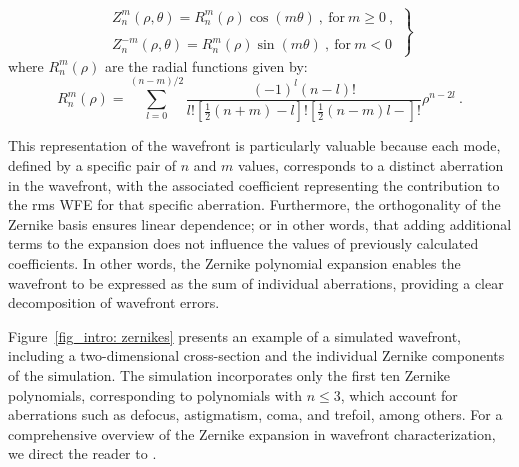 \begin{equation}
  \left.
  \begin{array}{l}
  Z _ n ^m (\rho, \theta) = R _ n ^m (\rho) \cos (m\theta)\ , \ \text{for} \ m \geqslant 0 \ ,\\
  \\
  Z _ n ^{-m} (\rho, \theta) = R _ n ^m (\rho) \sin (m\theta) \ , \ \text{for}  \ m < 0 \ 
  \end{array}
  \right\}
\end{equation}
where $R _ n ^m (\rho)$ are the radial functions given by:
\begin{equation}
  R_n^m(\rho)=\sum_{l=0}^{(n-m) / 2} \frac{(-1)^l(n-l)!}{l!\left[\frac{1}{2}(n+m)-l\right]!\left[\frac{1}{2}(n-m)l-\right]!}\rho ^{n - 2l} \ .
\end{equation}

This representation of the wavefront is particularly valuable because each mode, defined by a specific pair of $n$ and $m$ values, corresponds to a distinct aberration in the wavefront, with the associated coefficient representing the contribution to the rms WFE for that specific aberration. Furthermore, the orthogonality of the Zernike basis ensures linear dependence; or in other words, that adding additional terms to the expansion does not influence the values of previously calculated coefficients. In other words, the Zernike polynomial expansion enables the wavefront to be expressed as the sum of individual aberrations, providing a clear decomposition of wavefront errors.

Figure~\ref{fig_intro: zernikes} presents an example of a simulated wavefront, including a two-dimensional cross-section and the individual Zernike components of the simulation. The simulation incorporates only the first ten Zernike polynomials, corresponding to polynomials with $n \leqslant 3$, which account for aberrations such as defocus, astigmatism, coma, and trefoil, among others. For a comprehensive overview of the Zernike expansion in wavefront characterization, we direct the reader to \citet{Zernike_guide}.

